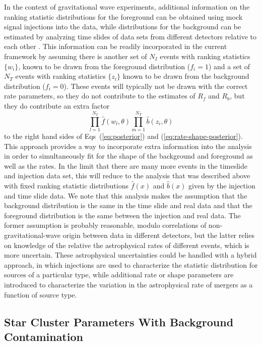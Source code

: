 \documentclass[aps,prd,reprint,nofootinbib]{revtex4-1}
\newcommand{\be}{\begin{equation}}
\newcommand{\ee}{\end{equation}}
\begin{document}
In the context of gravitational wave experiments, additional information on the ranking statistic distributions for the foreground can be obtained using mock signal injections into the data, while distributions for the background can be estimated by analyzing time slides of data sets from different detectors relative to each other \cite[e.g.,][]{ihope}. This information can be readily incorporated in the current framework by assuming there is another set of $N_I$ events with ranking statistics $\{ w_i \}$, known to be drawn from the foreground distribution ($f_i=1$) and a set of $N_T$ events with ranking statistics $\{z_i\}$ known to be drawn from the background distribution ($f_i=0$). These events will typically not be drawn with the correct rate parameters, so they do not contribute to the estimates of $R_f$ and $R_b$, but they do contribute an extra factor
\be
\prod_{l=1}^{N_I} \hat{f}(w_l, \theta ) \prod_{m=1}^{N_T} \hat{b}(z_i, \theta) 
\ee
to the right hand sides of Eqs~(\ref{eq:posterior}) and (\ref{eq:rate-shape-posterior}). This approach provides a way to incorporate extra information into the analysis in order to simultaneously fit for the shape of the background and foreground as well as the rates. In the limit that there are many more events in the timeslide and injection data set, this will reduce to the analysis that was described above with fixed ranking statistic distributions $\hat{f}(x)$ and $\hat{b}(x)$ given by the injection and time slide data. We note that this analysis makes the assumption that the background distribution is the same in the time slide and real data and that the foreground distribution is the same between the injection and real data. The former assumption is probably reasonable, modulo correlations of non-gravitational-wave origin between data in different detectors, but the latter relies on knowledge of the relative the astrophysical rates of different events, which is more uncertain. These astrophysical uncertainties could be handled with a hybrid approach, in which injections are used to characterize the statistic distribution for sources of a particular type, while additional rate or shape parameters are introduced to characterize the variation in the astrophysical rate of mergers as a function of source type.


\subsection{Star Cluster Parameters With Background Contamination}
\label{sec:star-cluster}
\end{document}

